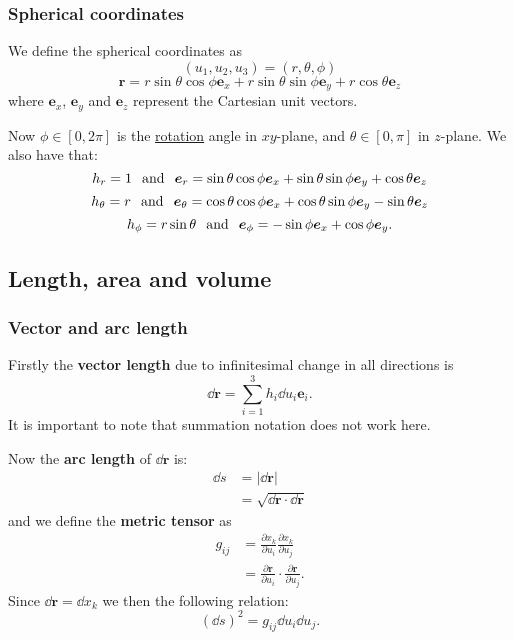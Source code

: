 \documentclass{article}
\begin{document}
\newpage

\subsubsection{Spherical coordinates}
We define the spherical coordinates as
$$(u_1,u_2,u_3)=(r,\theta,\phi)$$
$$\boldsymbol{r}=r\sin\theta\cos\phi\boldsymbol{e}_x
+r\sin\theta\sin\phi\boldsymbol{e}_y
+r\cos\theta\boldsymbol{e}_z$$
where $\boldsymbol{e}_x$, $\boldsymbol{e}_y$ and $\boldsymbol{e}_z$
represent the Cartesian unit vectors.

Now $\phi\in[0,2\pi]$ is the \underline{rotation} angle in $xy$-plane,
and $\theta\in[0,\pi]$ in $z$-plane. We also have that:
$$h_{r}=1\hspace{0.1in}\text{and}\hspace{0.1in}\boldsymbol{e}_{r}
=\sin\theta\cos\phi\boldsymbol{e}_x
+\sin\theta\sin\phi\boldsymbol{e}_y+\cos\theta\boldsymbol{e}_z$$
$$h_{\theta}=r\hspace{0.1in}\text{and}\hspace{0.1in}
\boldsymbol{e}_{\theta}
=\cos\theta\cos\phi\boldsymbol{e}_x+\cos\theta\sin\phi\boldsymbol{e}_y
-\sin\theta\boldsymbol{e}_z$$
$$h_{\phi}=r\sin\theta\hspace{0.1in}\text{and}\hspace{0.1in}\boldsymbol{e}_{\phi}
=-\sin\phi\boldsymbol{e}_x+\cos\phi\boldsymbol{e}_y.$$

\newpage

\subsection{Length, area and volume}

\subsubsection{Vector and arc length}
Firstly the \textbf{vector length} due to infinitesimal change in all directions is
$$\dd\boldsymbol{r}=\sum_{i=1}^{3}h_i\dd u_i\boldsymbol{e}_i.$$
It is important to note that summation notation does not work here.

Now the \textbf{arc length} of $\dd\boldsymbol{r}$ is:
\begin{align*}
    \dd s
    &=|\dd\boldsymbol{r}| \\
    &=\sqrt{\dd\boldsymbol{r}\cdot\dd\boldsymbol{r}}
\end{align*}
and we define the \textbf{metric tensor} as
\begin{align*}
    g_{ij}
    &=\frac{\partial x_k}{\partial u_i}\frac{\partial x_k}{\partial u_j} \\
    &=\frac{\partial\boldsymbol{r}}{\partial u_i}
    \cdot\frac{\partial\boldsymbol{r}}{\partial u_j}.
\end{align*}
Since $\dd\boldsymbol{r}=\dd x_k$ we then the following relation:
$$(\dd s)^2=g_{ij}\dd u_i\dd u_j.$$
\end{document}
